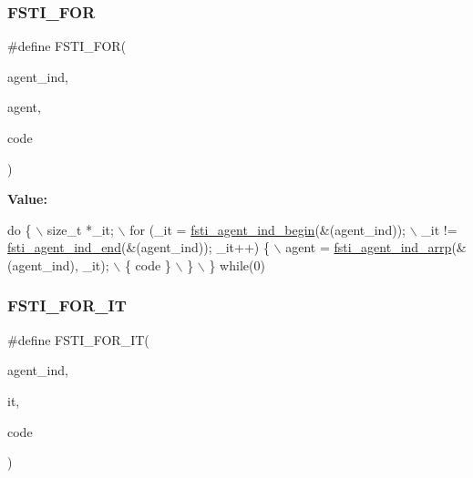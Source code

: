 \subsubsection{\texorpdfstring{F\+S\+T\+I\+\_\+\+F\+OR}{FSTI\_FOR}}
{\footnotesize\ttfamily \#define F\+S\+T\+I\+\_\+\+F\+OR(\begin{DoxyParamCaption}\item[{}]{agent\+\_\+ind,  }\item[{}]{agent,  }\item[{}]{code }\end{DoxyParamCaption})}

{\bfseries Value\+:}
\begin{DoxyCode}
\textcolor{keywordflow}{do} \{                           \(\backslash\)
        size\_t *\_it;                                                    \(\backslash\)
        for (\_it = \mbox{\hyperlink{fsti-agent_8h_af8ec082c043d0719f2933f78c9b74879}{fsti\_agent\_ind\_begin}}(&(agent\_ind));                  \(\backslash\)
             \_it != \mbox{\hyperlink{fsti-agent_8h_a0a007fca1a85b26dc9f890b5c9f5649a}{fsti\_agent\_ind\_end}}(&(agent\_ind)); \_it++) \{          \(\backslash\)
            agent = \mbox{\hyperlink{fsti-agent_8h_a0d3fcfadb1159b63508be133b30f8df7}{fsti\_agent\_ind\_arrp}}(&(agent\_ind), \_it);             \(\backslash\)
            \{ code \}                                                    \(\backslash\)
        \}                                                               \(\backslash\)
    \} \textcolor{keywordflow}{while}(0)
\end{DoxyCode}
\mbox{\label{fsti-agent_8h_a9cdc0f2e5160a06cdbbbd9a0807513f5}} 
\subsubsection{\texorpdfstring{F\+S\+T\+I\+\_\+\+F\+O\+R\+\_\+\+IT}{FSTI\_FOR\_IT}}
{\footnotesize\ttfamily \#define F\+S\+T\+I\+\_\+\+F\+O\+R\+\_\+\+IT(\begin{DoxyParamCaption}\item[{}]{agent\+\_\+ind,  }\item[{}]{it,  }\item[{}]{code }\end{DoxyParamCaption})}

